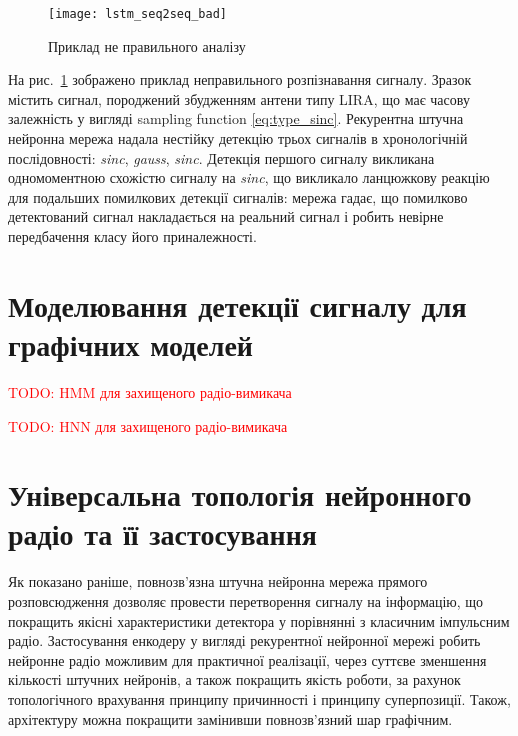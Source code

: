 \begin{figure}[htbp] \begin{center}
\texttt{[image: lstm\_seq2seq\_bad]}
\caption{Приклад не правильного аналізу} \label{fig:lstm_seq2seq_bad}
\end{center} \end{figure}

На рис.~\ref{fig:lstm_seq2seq_bad} зображено приклад неправильного
розпізнавання сигналу. Зразок містить сигнал, породжений збудженням антени 
типу LIRA, що має часову залежність у вигляді sampling function 
\eqref{eq:type_sinc}. Рекурентна штучна нейронна мережа надала нестійку
детекцію трьох сигналів в хронологічній послідовності: \textit{sinc}, 
\textit{gauss}, \textit{sinc}. Детекція першого сигналу викликана 
одномоментною схожістю сигналу на \textit{sinc}, що викликало ланцюжкову 
реакцію для подальших помилкових детекції сигналів: мережа гадає, що 
помилково детектований сигнал накладається на реальний сигнал і робить 
невірне передбачення класу його приналежності.

\section{Моделювання детекції сигналу для графічних моделей}

\textcolor{red}{TODO: HMM для захищеного радіо-вимикача}

\textcolor{red}{TODO: HNN для захищеного радіо-вимикача}

\section{Універсальна топологія нейронного радіо та її застосування}

Як показано раніше, повнозв'язна штучна нейронна мережа прямого розповсюдження
дозволяє провести перетворення сигналу на інформацію, що покращить якісні 
характеристики детектора у порівнянні з класичним імпульсним радіо. 
Застосування енкодеру у вигляді рекурентної нейронної мережі робить нейронне 
радіо можливим для практичної реалізації, через суттєве зменшення кількості 
штучних нейронів, а також покращить якість роботи, за рахунок топологічного 
врахування принципу причинності і принципу суперпозиції. Також, архітектуру 
можна покращити замінивши повнозв'язний шар графічним. 

